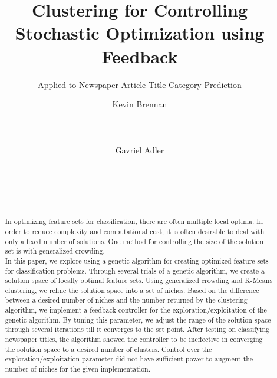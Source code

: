 \documentclass{sig-alternate}
\begin{document}
%

\title{Clustering for Controlling Stochastic Optimization using Feedback}
\subtitle{Applied to Newspaper Article Title Category Prediction}

\author{
\alignauthor
Kevin Brennan\\
       \\
       \\
       \\
\alignauthor
Gavriel Adler\\
       \\
       \\
       \\
       \\
}


\maketitle
\begin{abstract}
In optimizing feature sets for classification, there are often multiple local optima. In order to reduce complexity and computational cost, it is often desirable to deal with only a fixed number of solutions. One method for controlling the size of the solution set is with generalized crowding.\\
\indent In this paper, we explore using a genetic algorithm for creating optimized feature sets for classification problems. Through several trials of a genetic algorithm, we create a solution space of locally optimal feature sets. Using generalized crowding and K-Means clustering, we refine the solution space into a set of niches. Based on the difference between a desired number of niches and the number returned by the clustering algorithm, we implement a feedback controller for the exploration/exploitation of the genetic algorithm. By tuning this parameter, we adjust the range of the solution space through several iterations till it converges to the set point. After testing on classifying newspaper titles, the algorithm showed the controller to be ineffective in converging the solution space to a desired number of clusters. Control over the exploration/exploitation parameter did not have sufficient power to augment the number of niches for the given implementation.
\end{abstract}
\end{document}
